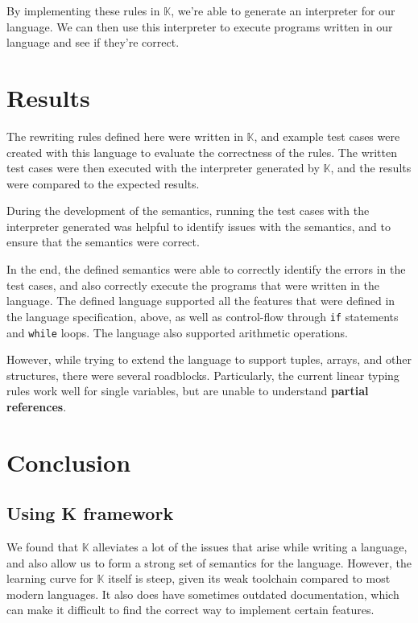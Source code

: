 \documentclass[review,twocolumn]{sigplanconf}
\begin{document}
By implementing these rules in $\mathbb{K}$, we're able to generate an interpreter for our language. We can then use this interpreter to execute programs written in our language and see if they're correct.

\section{Results}

The rewriting rules defined here were written in $\mathbb{K}$, and example test cases were created with this language to evaluate the correctness of the rules. The written test cases were then executed with the interpreter generated by $\mathbb{K}$, and the results were compared to the expected results.

During the development of the semantics, running the test cases with the interpreter generated was helpful to identify issues with the semantics, and to ensure that the semantics were correct.

In the end, the defined semantics were able to correctly identify the errors in the test cases, and also correctly execute the programs that were written in the language. The defined language supported all the features that were defined in the language specification, above, as well as control-flow through \verb!if! statements and \verb!while! loops. The language also supported arithmetic operations.

However, while trying to extend the language to support tuples, arrays, and other structures, there were several roadblocks. Particularly, the current linear typing rules work well for single variables, but are unable to understand \textbf{partial references}.

\section{Conclusion}

\subsection*{Using K framework}

We found that $\mathbb{K}$ alleviates a lot of the issues that arise while writing a language, and also allow us to form a strong set of semantics for the language. However, the learning curve for $\mathbb{K}$ itself is steep, given its weak toolchain compared to most modern languages. It also does have sometimes outdated documentation, which can make it difficult to find the correct way to implement certain features.
\end{document}
